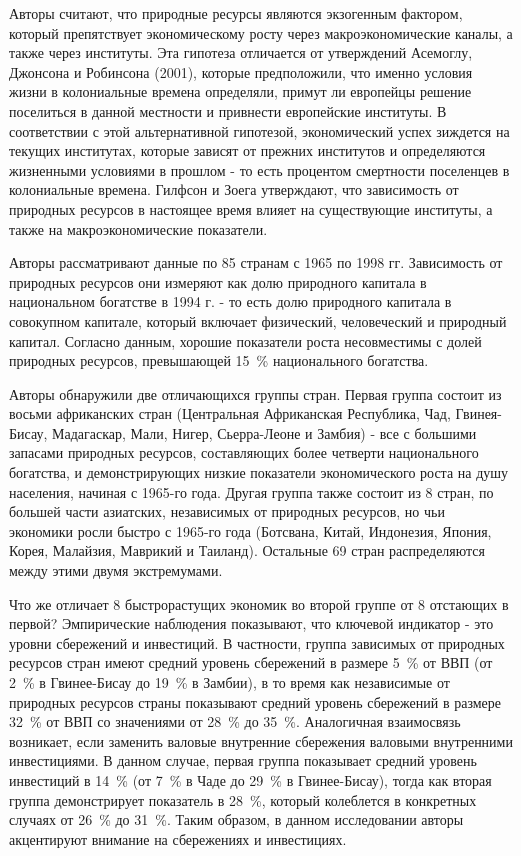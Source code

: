 \documentclass[12pt,a4paper, oneside]{extreport}
\begin{document}
Авторы считают, что природные ресурсы являются экзогенным фактором, который препятствует экономическому росту через макроэкономические каналы, а также через институты. Эта гипотеза отличается от утверждений Асемоглу, Джонсона и Робинсона (2001), которые предположили, что именно условия жизни в колониальные времена определяли, примут ли европейцы решение поселиться в данной местности и привнести европейские институты. В соответствии с этой альтернативной гипотезой, экономический успех зиждется на текущих институтах, которые зависят от прежних институтов и определяются жизненными условиями в прошлом - то есть процентом смертности поселенцев в колониальные времена. Гилфсон и Зоега утверждают, что зависимость от природных ресурсов в настоящее время влияет на существующие институты, а также на макроэкономические показатели.

Авторы рассматривают данные по 85 странам с 1965 по 1998 гг. Зависимость от природных ресурсов они измеряют как долю природного капитала в национальном богатстве в 1994 г. - то есть долю природного капитала в совокупном капитале, который включает физический, человеческий и природный капитал. Согласно данным, хорошие показатели роста несовместимы с долей природных ресурсов, превышающей 15~\% национального богатства. 

Авторы обнаружили две отличающихся группы стран. Первая группа состоит из восьми африканских стран (Центральная Африканская Республика, Чад, Гвинея-Бисау, Мадагаскар, Мали, Нигер, Сьерра-Леоне и Замбия) - все с большими запасами природных ресурсов, составляющих более четверти национального богатства, и демонстрирующих низкие показатели экономического роста на душу населения, начиная с 1965-го года. Другая группа также состоит из 8 стран, по большей части азиатских, независимых от природных ресурсов, но чьи экономики росли быстро с 1965-го года (Ботсвана, Китай, Индонезия, Япония, Корея, Малайзия, Маврикий и Таиланд). Остальные 69 стран распределяются между этими двумя экстремумами. 

Что же отличает 8 быстрорастущих экономик во второй группе от 8 отстающих в первой? Эмпирические наблюдения показывают, что ключевой индикатор - это уровни сбережений и инвестиций. В частности, группа зависимых от природных ресурсов стран имеют средний уровень сбережений в размере 5~\% от ВВП (от 2~\% в Гвинее-Бисау до 19~\% в Замбии), в то время как независимые от природных ресурсов страны показывают средний уровень сбережений в размере 32~\% от ВВП со значениями от 28~\% до 35~\%. Аналогичная взаимосвязь возникает, если заменить валовые внутренние сбережения валовыми внутренними инвестициями. В данном случае, первая группа показывает средний уровень инвестиций в 14~\% (от 7~\% в Чаде до 29~\% в Гвинее-Бисау), тогда как вторая группа демонстрирует показатель в 28~\%, который колеблется в конкретных случаях от 26~\% до 31~\%. Таким образом, в данном исследовании авторы акцентируют внимание на сбережениях и инвестициях.
\end{document}
